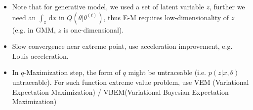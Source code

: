 \begin{itemize}[topsep=2pt,itemsep=0pt]
    \item Note that for generative model, we used a set of latent variable $ z $, further we need an $ \int _z \,\mathrm{d}x $ in $ Q(\theta |\theta ^{(t)}) $, thus E-M requires low-dimensionality of $ z $ (e.g. in GMM, $ z $ is one-dimensional).
    \item Slow convergence near extreme point, use acceleration improvement, e.g. Louis acceleration.
    \item In $ q $-Maximization step, the form of $ q $ might be untraceable (i.e. $ p(z|x,\theta ) $ untraceable). For such function extreme value problem, use VEM (Variational Expectation Maximization) / VBEM(Variational Bayesian Expectation Maximization)
\end{itemize}


    
    





        
